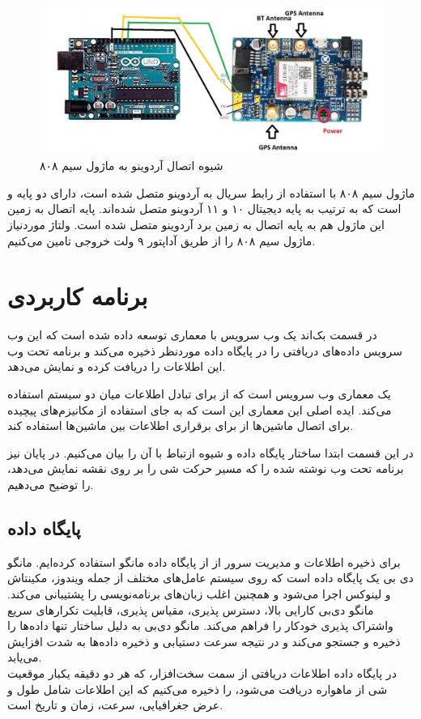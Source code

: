 \begin{figure}[!h]
	\centerline{\includegraphics[width=.7\textwidth]{sim808-arduino}}
	\caption{شیوه اتصال آردوینو به ماژول سیم ۸۰۸\cite{interface}}
\end{figure}


ماژول سیم ۸۰۸ با استفاده از رابط سریال به آردوینو متصل شده است، دارای دو پایه  و  است که به ترتیب به پایه دیجیتال ۱۰ و ۱۱ آردوینو متصل شده‌اند. پایه اتصال به زمین این ماژول هم به پایه اتصال به زمین برد آردوینو متصل شده است. ولتاژ موردنیاز ماژول سیم ۸۰۸ را از طریق آداپتور ۹ ولت خروجی تامین می‌کنیم. 
\section{برنامه کاربردی}
در قسمت بک‌اند یک وب سرویس با معماری  توسعه داده شده است که این وب سرویس داده‌های دریافتی را در پایگاه داده موردنظر ذخیره می‌کند و برنامه تحت وب این اطلاعات را دریافت کرده و نمایش می‌دهد.


یک معماری وب سرویس است که از  برای تبادل اطلاعات میان دو سیستم استفاده می‌کند. ایده اصلی این معماری این است که به جای استفاده از مکانیزم‌های پیچیده برای اتصال ماشین‌ها از  برای برقراری اطلاعات بین ماشین‌ها استفاده کند.

در این قسمت ابتدا ساختار پایگاه داده و شیوه ازتباط با آن را بیان می‌کنیم. در پایان نیز برنامه تحت وب نوشته شده را که مسیر حرکت شی را بر روی نقشه نمایش می‌دهد، را توضیح می‌دهیم.
\subsection{پایگاه داده}
برای ذخیره اطلاعات و مدیریت سرور از از پایگاه داده مانگو استفاده کرده‌ایم. مانگو دی بی یک پایگاه داده  است که روی سیستم عامل‌های مختلف از جمله ویندوز، مکینتاش و لینوکس اجرا می‌شود و همچنین اغلب زبان‌های برنامه‌نویسی را پشتیبانی می‌کند. مانگو دی‌بی کارایی بالا، دسترس پذیری، مقیاس پذیری، قابلیت تکرارهای سریع واشتراک پذیری خودکار را فراهم می‌کند. مانگو دی‌بی به دلیل ساختار  تنها داده‌ها را ذخیره و جستجو می‌کند و در نتیجه سرعت دستیابی و ذخیره داده‌ها به شدت افزایش می‌یابد.
\\
در پایگاه داده اطلاعات دریافتی از سمت سخت‌افزار، که هر دو دقیقه یکبار موقعیت شی از ماهواره دریافت می‌شود، را ذخیره می‌کنیم که این اطلاعات شامل طول و عرض جغرافیایی، سرعت، زمان و تاریخ است.
